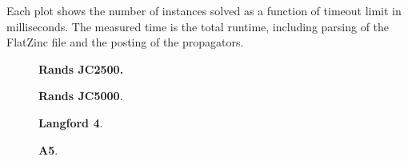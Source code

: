 \documentclass[a4paper,11pt]{article}
\numberwithin{equation}{section}
\begin{document}
Each plot shows the number of instances solved as a function
of timeout limit in milliseconds. The measured time is the total
runtime, including parsing of the FlatZinc file and the posting of
the propagators.


\begin{figure}[H]
  \begin{minipage}[b][8cm][s]{0.45\textwidth}
    \centering
    \vfill
    \begin{tikzpicture}[scale=0.9]
      
    \end{tikzpicture}
    \vfill
    \caption{\textbf{Rands JC2500.} }
    \vspace{\baselineskip}
  \end{minipage}\qquad
  \begin{minipage}[b][8cm][s]{0.45\textwidth}
    \centering
    \vfill
    \begin{tikzpicture}[scale=0.9]
      
    \end{tikzpicture}
    \vfill
    \caption{\textbf{Rands JC5000}. }
    \vspace{\baselineskip}
  \end{minipage}\qquad
\end{figure}

\begin{figure}
  \begin{minipage}[b][8cm][s]{0.45\textwidth}
    \centering
    \vfill
    \begin{tikzpicture}[scale=0.9]
      
    \end{tikzpicture}
    \vfill
    \caption{\textbf{Langford 4}.}
    \vspace{\baselineskip}
  \end{minipage}\qquad
  \begin{minipage}[b][8cm][s]{0.45\textwidth}
    \centering
    \vfill
    \begin{tikzpicture}[scale=0.9]
      
    \end{tikzpicture}
    \vfill
    \caption{\textbf{A5}.}
    \vspace{\baselineskip}
  \end{minipage}\qquad

\end{figure}
\end{document}
